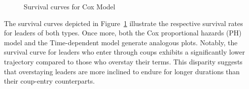 \documentclass[
  12pt,
  a4paper,
  12pt]{article}
\begin{document}
\begin{figure}
\begin{minipage}{0.50\linewidth}
{}


\end{minipage}%

\caption{\label{fig-coxSurv}Survival curves for Cox Model}

\end{figure}%

The survival curves depicted in Figure~\ref{fig-coxSurv} illustrate the
respective survival rates for leaders of both types. Once more, both the
Cox proportional hazards (PH) model and the Time-dependent model
generate analogous plots. Notably, the survival curve for leaders who
enter through coups exhibits a significantly lower trajectory compared
to those who overstay their terms. This disparity suggests that
overstaying leaders are more inclined to endure for longer durations
than their coup-entry counterparts.
\end{document}
